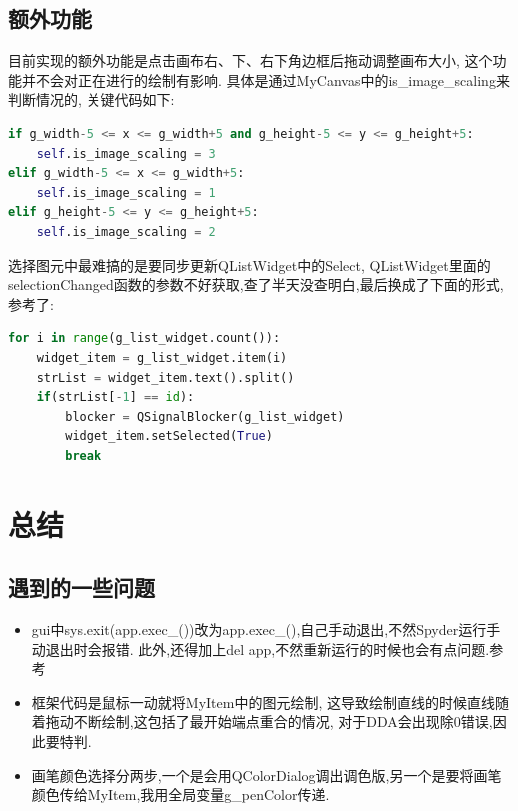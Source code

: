 \documentclass[a4paper,UTF8]{article}
\theoremstyle{definition}
\begin{document}
\subsection{额外功能}
目前实现的额外功能是点击画布右、下、右下角边框后拖动调整画布大小, 这个功能并不会对正在进行的绘制有影响. 具体是通过MyCanvas中的is\_image\_scaling来判断情况的, 关键代码如下:\\
\begin{lstlisting}[language={python}]
if g_width-5 <= x <= g_width+5 and g_height-5 <= y <= g_height+5:
    self.is_image_scaling = 3  
elif g_width-5 <= x <= g_width+5:  
    self.is_image_scaling = 1  
elif g_height-5 <= y <= g_height+5:  
    self.is_image_scaling = 2
\end{lstlisting}
选择图元中最难搞的是要同步更新QListWidget中的Select, QListWidget里面的selectionChanged函数的参数不好获取,查了半天没查明白,最后换成了下面的形式,参考了\cite{choose}:\\
\begin{lstlisting}[language={python}]
for i in range(g_list_widget.count()):
    widget_item = g_list_widget.item(i)
    strList = widget_item.text().split()
    if(strList[-1] == id):
        blocker = QSignalBlocker(g_list_widget)
        widget_item.setSelected(True)
        break
\end{lstlisting}
\section{总结}
\subsection{遇到的一些问题}
\begin{itemize}
	\item gui中sys.exit(app.exec\_())改为app.exec\_(),自己手动退出,不然Spyder运行手动退出时会报错.
	此外,还得加上del app,不然重新运行的时候也会有点问题.参考\cite{exit}
	
	\item 框架代码是鼠标一动就将MyItem中的图元绘制,
	这导致绘制直线的时候直线随着拖动不断绘制,这包括了最开始端点重合的情况,
	对于DDA会出现除0错误,因此要特判.
	
	\item 画笔颜色选择分两步,一个是会用QColorDialog调出调色版,另一个是要将画笔颜色传给MyItem,我用全局变量g\_penColor传递.
\end{itemize}
\end{document}
